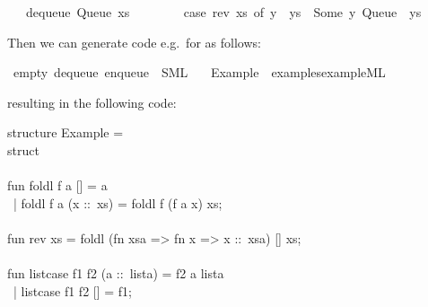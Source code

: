 \begin{isabellebody}
\ \ {\isacharbar}\ {\isachardoublequoteopen}dequeue\ {\isacharparenleft}Queue\ xs\ {\isacharbrackleft}{\isacharbrackright}{\isacharparenright}\ {\isacharequal}\isanewline
\ \ \ \ \ \ {\isacharparenleft}case\ rev\ xs\ of\ y\ {\isacharhash}\ ys\ {\isasymRightarrow}\ {\isacharparenleft}Some\ y{\isacharcomma}\ Queue\ {\isacharbrackleft}{\isacharbrackright}\ ys{\isacharparenright}{\isacharparenright}{\isachardoublequoteclose}%
\endisatagquote
{\isafoldquote}%
%
\isadelimquote
%
\endisadelimquote
%
\begin{isamarkuptext}%
\noindent Then we can generate code e.g.~for  as follows:%
\end{isamarkuptext}%
\isamarkuptrue%
%
\isadelimquote
%
\endisadelimquote
%
\isatagquote
{}\isamarkupfalse%
\ empty\ dequeue\ enqueue\ \ SML\isanewline
\ \ \ Example\ \ {\isachardoublequoteopen}examples{\isacharslash}example{\isachardot}ML{\isachardoublequoteclose}%
\endisatagquote
{\isafoldquote}%
%
\isadelimquote
%
\endisadelimquote
%
\begin{isamarkuptext}%
\noindent resulting in the following code:%
\end{isamarkuptext}%
\isamarkuptrue%
%
\isadelimquote
%
\endisadelimquote
%
\isatagquote
%
\begin{isamarkuptext}%
\isatypewriter%
\noindent%
\hspace*{0pt}structure Example = \\
\hspace*{0pt}struct\\
\hspace*{0pt}\\
\hspace*{0pt}fun foldl f a [] = a\\
\hspace*{0pt} ~| foldl f a (x ::~xs) = foldl f (f a x) xs;\\
\hspace*{0pt}\\
\hspace*{0pt}fun rev xs = foldl (fn xsa => fn x => x ::~xsa) [] xs;\\
\hspace*{0pt}\\
\hspace*{0pt}fun list{}case f1 f2 (a ::~lista) = f2 a lista\\
\hspace*{0pt} ~| list{}case f1 f2 [] = f1;\\

\end{isamarkuptext}
\end{isabellebody}
